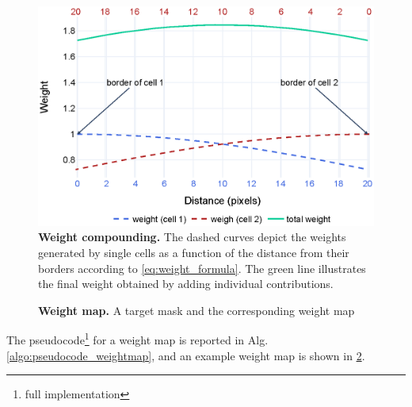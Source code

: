 %
\begin{figure}
    \centering
    \includegraphics[width=.6\textwidth]{figures/130_methods/weight_calculation.eps}
    \caption{\textbf{Weight compounding.}
    The dashed curves depict the weights generated by single cells as a function of the distance from their borders according to \cref{eq:weight_formula}.
    The green line illustrates the final weight obtained by adding individual contributions.}
    \label{fig:weight_calculation}
\end{figure}
%
\begin{figure}
    \centering
    \caption{\textbf{Weight map.} A target mask and the corresponding weight map}
    \label{fig:weight_map_example}
\end{figure}
%
The pseudocode\footnote{full implementation \githubweights} for a weight map is reported in Alg. \ref{algo:pseudocode_weightmap}, and an example weight map is shown in \cref{fig:weight_map_example}.

